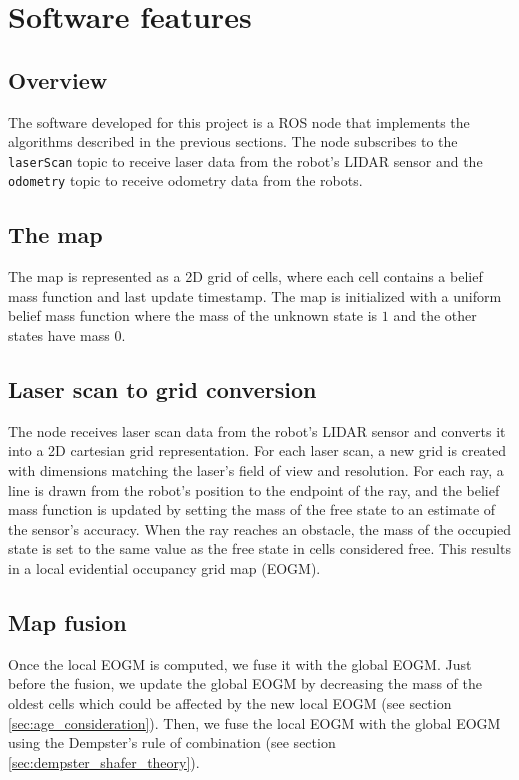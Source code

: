 \section{Software features}

\subsection{Overview}

The software developed for this project is a ROS node that implements the algorithms described in the previous sections.
The node subscribes to the \texttt{laserScan} topic to receive laser data from the robot's LIDAR sensor and the \texttt{odometry} topic to receive odometry data from the robots.

\subsection{The map}

The map is represented as a 2D grid of cells, where each cell contains a belief mass function and last update timestamp.
The map is initialized with a uniform belief mass function where the mass of the unknown state is $1$ and the other states have mass $0$.

\subsection{Laser scan to grid conversion}

The node receives laser scan data from the robot's LIDAR sensor and converts it into a 2D cartesian grid representation.
For each laser scan, a new grid is created with dimensions matching the laser's field of view and resolution.
For each ray, a line is drawn from the robot's position to the endpoint of the ray, and the belief mass function is updated by setting the mass of the free state to an estimate of the sensor's accuracy.
When the ray reaches an obstacle, the mass of the occupied state is set to the same value as the free state in cells considered free.
This results in a local evidential occupancy grid map (EOGM).

\subsection*{Map fusion}

Once the local EOGM is computed, we fuse it with the global EOGM.
Just before the fusion, we update the global EOGM by decreasing the mass of the oldest cells which could be affected by the new local EOGM (see section \ref{sec:age_consideration}).
Then, we fuse the local EOGM with the global EOGM using the Dempster's rule of combination (see section \ref{sec:dempster_shafer_theory}).

